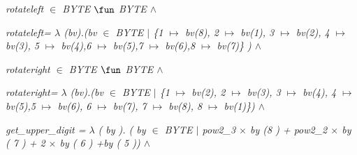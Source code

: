 \hspace*{0.20in}

\hspace*{0.20in}

\hspace*{0.20in}\it rotateleft  $\in$  \it BYTE  $\fun$  \it BYTE\hspace*{0.10in} $\land$ 

\hspace*{0.20in}\it rotateleft\hspace*{0.10in}\rm =  $\lambda$ \rm (\it bv\rm )\rm .\rm (\it bv $\in$ \it BYTE $\mid$  \rm \{\rm 1 $\mapsto$ \it bv\rm (\rm 8\rm )\rm , \rm 2 $\mapsto$ \it bv\rm (\rm 1\rm )\rm , \rm 3 $\mapsto$ \it bv\rm (\rm 2\rm )\rm , \rm 4 $\mapsto$ \it bv\rm (\rm 3\rm )\rm , \rm 5 $\mapsto$ \it bv\rm (\rm 4\rm )\rm ,\rm 6 $\mapsto$ \it bv\rm (\rm 5\rm )\rm ,\rm 7 $\mapsto$ \it bv\rm (\rm 6\rm )\rm ,\rm 8 $\mapsto$ \it bv\rm (\rm 7\rm )\rm \} \rm )  $\land$ 

\hspace*{0.20in}

\hspace*{0.20in}

\hspace*{0.20in}\it rotateright  $\in$  \it BYTE  $\fun$  \it BYTE\hspace*{0.10in} $\land$ 

\hspace*{0.20in}\it rotateright\rm =  $\lambda$ \rm (\it bv\rm )\rm .\rm (\it bv $\in$ \it BYTE $\mid$ \rm \{\rm 1 $\mapsto$ \it bv\rm (\rm 2\rm )\rm , \rm 2 $\mapsto$ \it bv\rm (\rm 3\rm )\rm , \rm 3 $\mapsto$ \it bv\rm (\rm 4\rm )\rm , \rm 4 $\mapsto$ \it bv\rm (\rm 5\rm )\rm ,\rm 5 $\mapsto$ \it bv\rm (\rm 6\rm )\rm , \rm 6 $\mapsto$ \it bv\rm (\rm 7\rm )\rm , \rm 7 $\mapsto$ \it bv\rm (\rm 8\rm )\rm , \rm 8 $\mapsto$ \it bv\rm (\rm 1\rm )\rm \}\rm )\hspace*{0.10in} $\land$ 

\hspace*{0.20in}

\hspace*{0.20in}

\hspace*{0.20in}\it get\_upper\_digit \rm = $\lambda$ \rm ( \it by \rm )\rm . \rm ( \it by  $\in$  \it BYTE  $\mid$ \hspace*{0.10in}\it pow2\_3  $\times$  \it by \rm (\rm 8 \rm ) \rm + \it pow2\_2  $\times$  \it by \rm ( \rm 7 \rm ) \rm + \rm 2  $\times$  \it by \rm ( \rm 6 \rm ) \rm +\hspace*{0.10in}\it by \rm ( \rm 5 \rm )\hspace*{0.15in}\rm )  $\land$ 

